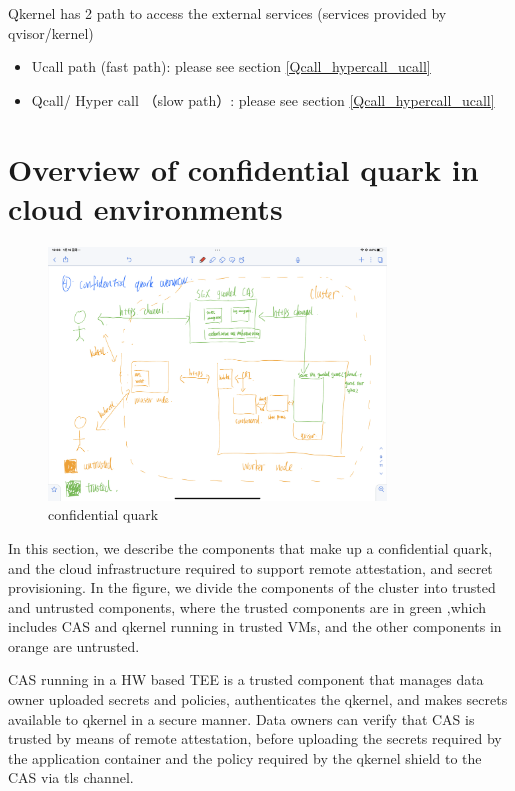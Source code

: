 Qkernel has 2 path to access the external services (services provided by qvisor/kernel)
\begin{itemize}
    \item  Ucall path (fast path): please see section \ref*{Qcall_hypercall_ucall}
    \item  Qcall/ Hyper call （slow path）: please see section \ref*{Qcall_hypercall_ucall}
\end{itemize}

\section{Overview of confidential quark in cloud environments}
\begin{figure}[H]
    \centering
    \includegraphics[width=0.8\textwidth]{images/IMG_4414.PNG}
    \caption[confidential quark]{confidential quark}
    \label{fig:confidential_quark}
\end{figure}
In this section, we describe the components that make up a confidential quark, and the cloud infrastructure required to support remote attestation, and secret provisioning.
In the figure, we divide the components of the cluster into trusted and untrusted components, where the trusted components are in green ,which includes CAS and qkernel running in trusted VMs, and the other components in orange are untrusted.

CAS running in a HW based TEE is a trusted component that manages data owner uploaded secrets and policies, authenticates the qkernel, and makes secrets available to qkernel in a secure manner. Data owners can verify that CAS is trusted by means of remote attestation, before uploading the secrets required by the application container and the policy required by the qkernel shield to the CAS via tls channel.

